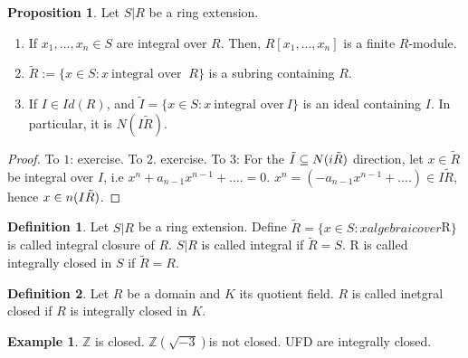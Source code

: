 \documentclass{article}
\theoremstyle{definition}
\theoremstyle{definition}
\theoremstyle{definition}
\newtheorem{proposition}{Proposition}[section]
\theoremstyle{definition}
\theoremstyle{definition}
\newtheorem{definition}{Definition}[section]
\theoremstyle{definition}
\theoremstyle{definition}
\newtheorem{example}{Example}[section]
\begin{document}
\begin{tcolorbox}[colback=blue!5!white,colframe=blue!30!white]
\begin{proposition}
Let $S|R$ be a ring extension. 
\begin{enumerate}
    \item If $x_1,...,x_n\in S$ are integral over $R$. Then, $R[x_1,...,x_n]$ is a finite $R$-module. 
    \item $\tilde{R}:=\{ x\in S: x \ \textrm{integral over } \ R \}$ is a subring containing $R$. 
    \item If $I\in Id(R)$, and $\tilde{I}=\{ x\in S: x \  \textrm{integral over} \ I \}$ is an ideal containing $I$. In particular, it is $N(I\tilde{R})$. 
\end{enumerate}
\end{proposition}
\end{tcolorbox}
\begin{proof}
    To $1$: exercise. To $2$. exercise. To $3$: For the $\tilde{I}\subseteq N(i\Tilde{R})$ direction, let $x\in \tilde{R}$ be integral over $I$, i.e $x^n+a_{n-1}x^{n-1}+....=0$. $x^n=(-a_{n-1}x^{n-1}+....)\in I\tilde{R}$, hence $x\in n(I\Tilde{R})$. 
\end{proof}


\begin{tcolorbox}[colback=purple!5!white,colframe=purple!75!black]
\begin{definition}
Let $S|R$ be a ring extension. Define $\tilde{R}=\{ x\in S: x algebraic over $R$ \}$ is called integral closure of $R$. $S|R$ is called integral if $\tilde{R}=S$. R is called integrally closed in $S$ if $\tilde{R}=R$.
\end{definition}
\end{tcolorbox}


\begin{tcolorbox}[colback=purple!5!white,colframe=purple!75!black]
\begin{definition}
Let $R$ be a domain and $K$ its quotient field. $R$ is called inetgral closed if $R$ is integrally closed in $K$.
\end{definition}
\end{tcolorbox}



\begin{tcolorbox}[colback=yellow!5!white,colframe=yellow!30!white]
\begin{example}
$\mathbb{Z}$ is closed. $\mathbb{Z}(\sqrt{-3})$is not closed.  UFD are integrally closed. 
\end{example}
\end{tcolorbox}
\end{document}
